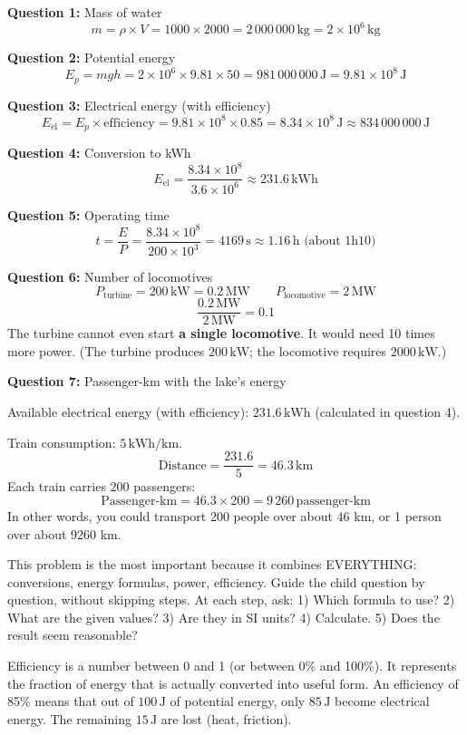 \documentclass[11pt,a4paper]{article}
\newcommand{\corrbox}[1]{
\begin{tcolorbox}[colback=correctgreen!8!white,colframe=correctgreen!60!black]
#1
\end{tcolorbox}
}
\newcommand{\tipbox}[1]{
\begin{tcolorbox}[colback=tipblue!8!white,colframe=tipblue!60!black,title=\textbf{How to explain}]
#1
\end{tcolorbox}
}
\begin{document}
\corrbox{
\textbf{Question 1:} Mass of water
\[m = \rho \times V = 1000 \times 2000 = 2\,000\,000\,\text{kg} = 2 \times 10^{6}\,\text{kg}\]

\textbf{Question 2:} Potential energy
\[E_p = mgh = 2 \times 10^{6} \times 9.81 \times 50 = 981\,000\,000\,\text{J} = 9.81 \times 10^{8}\,\text{J}\]

\textbf{Question 3:} Electrical energy (with efficiency)
\[E_{\text{el}} = E_p \times \text{efficiency} = 9.81 \times 10^{8} \times 0.85 = 8.34 \times 10^{8}\,\text{J} \approx 834\,000\,000\,\text{J}\]

\textbf{Question 4:} Conversion to kWh
\[E_{\text{el}} = \frac{8.34 \times 10^{8}}{3.6 \times 10^{6}} \approx 231.6\,\text{kWh}\]

\textbf{Question 5:} Operating time
\[t = \frac{E}{P} = \frac{8.34 \times 10^{8}}{200 \times 10^{3}} = 4169\,\text{s} \approx 1.16\,\text{h} \text{ (about 1h10)}\]

\textbf{Question 6:} Number of locomotives
\[
P_{\text{turbine}} = 200\,\text{kW} = 0.2\,\text{MW}
\qquad
P_{\text{locomotive}} = 2\,\text{MW}
\]
\[
\frac{0.2\,\text{MW}}{2\,\text{MW}} = 0.1
\]
The turbine cannot even start \textbf{a single locomotive}. It would need 10 times more power. (The turbine produces $200\,\text{kW}$; the locomotive requires $2000\,\text{kW}$.)

\textbf{Question 7:} Passenger-km with the lake's energy

Available electrical energy (with efficiency): $231.6\,\text{kWh}$ (calculated in question 4).

Train consumption: $5\,\text{kWh/km}$.
\[
\text{Distance} = \frac{231.6}{5} = 46.3\,\text{km}
\]
Each train carries $200$ passengers:
\[
\text{Passenger-km} = 46.3 \times 200 = 9\,260\,\text{passenger-km}
\]
In other words, you could transport 200 people over about 46 km, or 1 person over about 9260 km.
}

\tipbox{
This problem is the most important because it combines EVERYTHING: conversions, energy formulas, power, efficiency. Guide the child question by question, without skipping steps. At each step, ask: 1) Which formula to use? 2) What are the given values? 3) Are they in SI units? 4) Calculate. 5) Does the result seem reasonable?
}

\tipbox{
Efficiency is a number between 0 and 1 (or between 0\% and 100\%). It represents the fraction of energy that is actually converted into useful form. An efficiency of 85\% means that out of $100\,\text{J}$ of potential energy, only $85\,\text{J}$ become electrical energy. The remaining $15\,\text{J}$ are lost (heat, friction).
}
\end{document}
